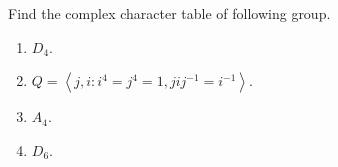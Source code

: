 \documentclass{ctexart}
\newif\ifpreface
\begin{document}
\large
\setlength{\baselineskip}{1.2em}
\ifpreface
  
  \newgeometry{left=2cm,right=2cm,top=2cm,bottom=2cm}
\else
  \maketitle
\fi
\begin{problem}
Find the complex character table of following group.
\begin{enumerate}
  \item \(D_4\).
  \item \(Q=\left\langle j,i:i^4=j^4=1,jij^{-1}=i^{-1}\right\rangle \).
  \item \(A_4\).
  \item \(D_6\).
\end{enumerate}
\end{problem}
\end{document}

